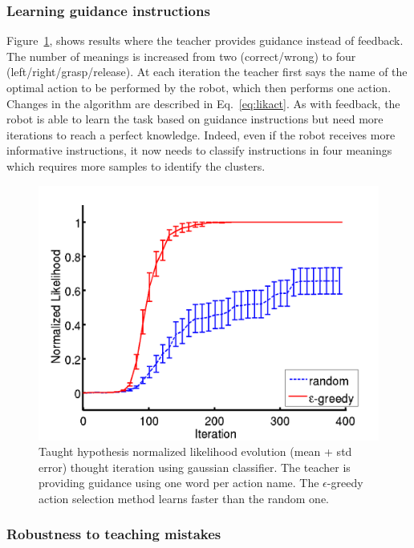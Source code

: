 \subsubsection{Learning guidance instructions}
%
Figure~\ref{fig:Guidance}, shows results where the teacher provides guidance instead of feedback. The number of meanings is increased from two (correct/wrong) to four (left/right/grasp/release). At each iteration the teacher first says the name of the optimal action to be performed by the robot, which then performs one action. Changes in the algorithm are described in Eq.~\ref{eq:likact}. As with feedback, the robot is able to learn the task based on guidance instructions but need more iterations to reach a perfect knowledge. Indeed, even if the robot receives more informative instructions, it now needs to classify instructions in four meanings which requires more samples to identify the clusters.  
%
\begin{figure}[!htbp]
	\centering
		\includegraphics[width=\ww\columnwidth]{images/results/guidance}
	\caption{Taught hypothesis normalized likelihood evolution (mean + std error) thought iteration using gaussian classifier. The teacher is providing guidance using one word per action name. The $\epsilon$-greedy action selection method learns faster than the random one. }
	\label{fig:Guidance}
\end{figure}

\subsubsection{Robustness to teaching mistakes}

